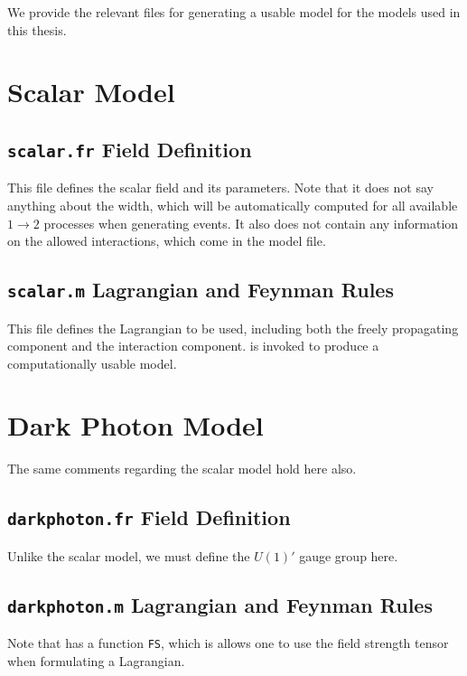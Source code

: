\label{app:model_files}
We provide the relevant files for generating a usable \feynrules model for the models used in this thesis.

\section{Scalar Model}
\subsection{\texttt{scalar.fr} Field Definition}
This file defines the scalar field and its parameters.
Note that it does not say anything about the width, which will be automatically computed for all available $1 \rightarrow 2$ processes when generating events.
It also does not contain any information on the allowed interactions, which come in the model file.


\subsection{\texttt{scalar.m} Lagrangian and Feynman Rules}
This file defines the Lagrangian to be used, including both the freely propagating component and the interaction component.
\feynrules is invoked to produce a computationally usable model.



\section{Dark Photon Model}
The same comments regarding the scalar model hold here also.
\subsection{\texttt{darkphoton.fr} Field Definition}
Unlike the scalar model, we must define the $U(1)'$ gauge group here.

\subsection{\texttt{darkphoton.m} Lagrangian and Feynman Rules}
Note that \feynrules has a function \texttt{FS}, which is allows one to use the field strength tensor when formulating a Lagrangian.

